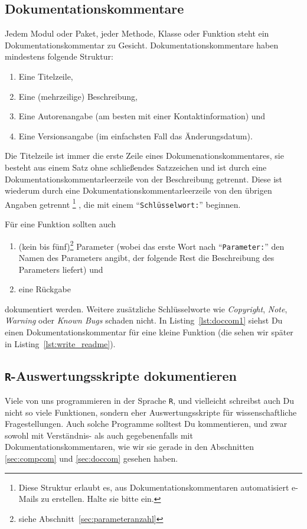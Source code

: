\documentclass[twoside]{scrreprt}
\providecommand{\R}{\texttt{R}}
\providecommand{\code}[1]{\texttt{#1}}
\begin{document}
\subsection{Dokumentationskommentare\label{sec:doccom}}
Jedem Modul oder Paket, jeder Methode, Klasse oder Funktion steht ein
Dokumentationskommentar zu Gesicht. Dokumentationskommentare haben mindestens 
folgende Struktur:
\begin{enumerate}
    \item Eine Titelzeile,
    \item Eine (mehrzeilige) Beschreibung,
    \item Eine Autorenangabe (am besten mit einer Kontaktinformation) und
    \item Eine Versionsangabe (im einfachsten Fall das \"A{}nderungsdatum).
\end{enumerate}
Die Titelzeile ist immer die erste Zeile eines Dokumenationskommentares, sie
besteht aus einem Satz ohne schlie\ss{}endes Satzzeichen und ist durch eine
Dokumentationskommentarleerzeile von der Beschreibung getrennt. Diese ist
wiederum durch eine Dokumentationskommentarleerzeile von den \"u{}brigen Angaben
getrennt%
\footnote{Diese Struktur erlaubt es, aus Dokumentationskommentaren
automatisiert e-Mails zu erstellen. Halte sie bitte ein.}%
, die mit einem "`\code{Schl\"u{}sselwort:}"' beginnen.

F\"u{}r eine Funktion sollten auch 
\begin{enumerate}[resume]
    \item (kein bis f\"u{}nf)\footnote{siehe
	    Abschnitt~\ref{sec:parameteranzahl}} Parameter (wobei das erste Wort
	    nach "`\code{Parameter:}"' den Namen des Parameters angibt, der 
	    folgende Rest die Beschreibung des Parameters liefert) und 
    \item eine R\"u{}ckgabe
\end{enumerate}
dokumentiert werden. Weitere zus\"a{}tzliche Schl\"u{}sselworte wie 
\emph{Copyright}, \emph{Note}, \emph{Warning} oder \emph{Known Bugs} 
schaden nicht.
In Listing~\ref{lst:doccom1} siehst Du einen Dokumentationskommentar
f\"u{}r eine kleine Funktion (die sehen wir sp\"a{}ter in
Listing~\ref{lst:write_readme}).


\subsection{\R{}-Auswertungsskripte dokumentieren
\label{sec:rdoc}
}
Viele von uns programmieren in der Sprache \R{}, und vielleicht schreibst 
auch Du nicht so viele Funktionen, sondern eher Auswertungsskripte f\"u{}r 
wissenschaftliche Fragestellungen. 
Auch solche Programme solltest Du kommentieren, und zwar sowohl mit 
Verst\"a{}ndnis- als auch gegebenenfalls mit  Dokumentationskommentaren, wie wir
sie gerade in den Abschnitten \ref{sec:compcom} und \ref{sec:doccom} gesehen 
haben.
\end{document}
